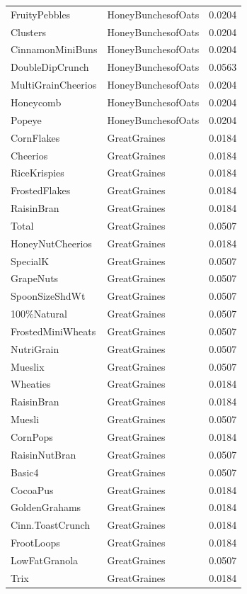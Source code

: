 \begin{longtable}{llr}
FruityPebbles & HoneyBunchesofOats & 0.0204 \\
Clusters & HoneyBunchesofOats & 0.0204 \\
CinnamonMiniBuns & HoneyBunchesofOats & 0.0204 \\
DoubleDipCrunch & HoneyBunchesofOats & 0.0563 \\
MultiGrainCheerios & HoneyBunchesofOats & 0.0204 \\
Honeycomb & HoneyBunchesofOats & 0.0204 \\
Popeye & HoneyBunchesofOats & 0.0204 \\
CornFlakes & GreatGraines & 0.0184 \\
Cheerios & GreatGraines & 0.0184 \\
RiceKrispies & GreatGraines & 0.0184 \\
FrostedFlakes & GreatGraines & 0.0184 \\
RaisinBran & GreatGraines & 0.0184 \\
Total & GreatGraines & 0.0507 \\
HoneyNutCheerios & GreatGraines & 0.0184 \\
SpecialK & GreatGraines & 0.0507 \\
GrapeNuts & GreatGraines & 0.0507 \\
SpoonSizeShdWt & GreatGraines & 0.0507 \\
100\%Natural & GreatGraines & 0.0507 \\
FrostedMiniWheats & GreatGraines & 0.0507 \\
NutriGrain & GreatGraines & 0.0507 \\
Mueslix & GreatGraines & 0.0507 \\
Wheaties & GreatGraines & 0.0184 \\
RaisinBran & GreatGraines & 0.0184 \\
Muesli & GreatGraines & 0.0507 \\
CornPops & GreatGraines & 0.0184 \\
RaisinNutBran & GreatGraines & 0.0507 \\
Basic4 & GreatGraines & 0.0507 \\
CocoaPus & GreatGraines & 0.0184 \\
GoldenGrahams & GreatGraines & 0.0184 \\
Cinn.ToastCrunch & GreatGraines & 0.0184 \\
FrootLoops & GreatGraines & 0.0184 \\
LowFatGranola & GreatGraines & 0.0507 \\
Trix & GreatGraines & 0.0184 \\

\end{longtable}
